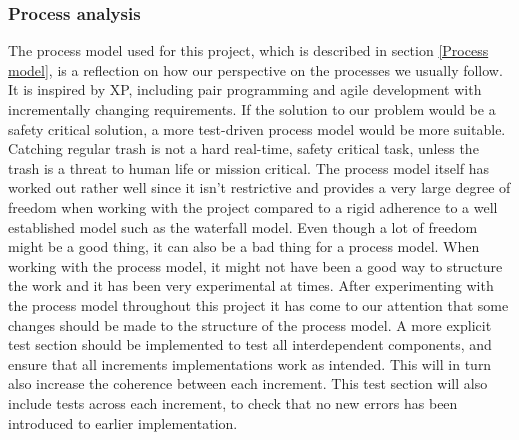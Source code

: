 \subsubsection{Process analysis}
The process model used for this project, which is described in section \ref{Process model}, is a reflection on how our perspective on the processes we usually follow. It is inspired by XP, including pair programming and agile development with incrementally changing requirements. If the solution to our problem would be a safety critical solution, a more test-driven process model would be more suitable. Catching regular trash is not a hard real-time, safety critical task, unless the trash is a threat to human life or mission critical.\newline
The process model itself has worked out rather well since it isn’t restrictive and provides a very large degree of freedom when working with the project compared to a rigid adherence to a well established model such as the waterfall model. \newline
Even though a lot of freedom might be a good thing, it can also be a bad thing for a process model. When working with the process model, it might not have been a good way to structure the work and it has been very experimental at times. \newline
After experimenting with the process model throughout this project it has come to our attention that some changes should be made to the structure of the process model. A more explicit test section should be implemented to test all interdependent components, and ensure that all increments implementations work as intended. This will in turn also increase the coherence between each increment. This test section will also include tests across each increment, to check that no new errors has been introduced to earlier implementation.
